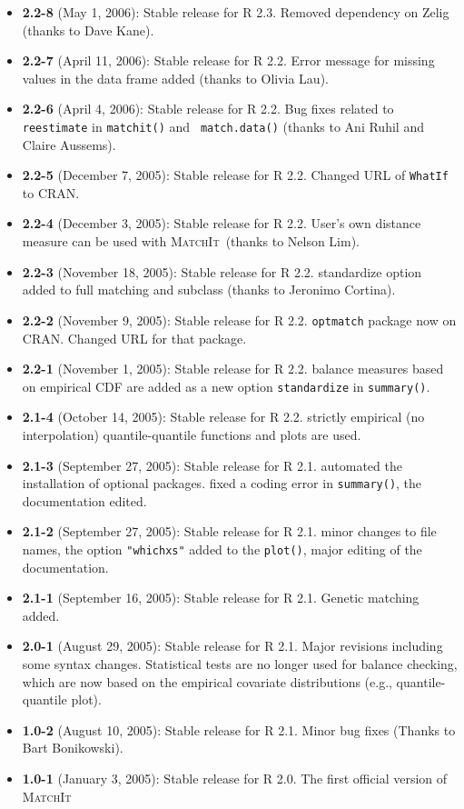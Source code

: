 \documentclass[oneside,letterpaper,12pt]{book}
\newcommand{\MatchIt}{\textsc{MatchIt}}
\begin{document}
\begin{itemize}
\item \textbf{2.2-8} (May 1, 2006): Stable release for R 2.3.
  Removed dependency on Zelig (thanks to Dave Kane).
\item \textbf{2.2-7} (April 11, 2006): Stable release for R 2.2.
  Error message for missing values in the data frame added
  (thanks to Olivia Lau).
\item \textbf{2.2-6} (April 4, 2006): Stable release for R 2.2.
  Bug fixes related to {\tt reestimate} in {\tt matchit()} and {\tt
  match.data()} (thanks to Ani Ruhil and Claire Aussems). 
\item \textbf{2.2-5} (December 7, 2005): Stable release for R 2.2.
  Changed URL of {\tt WhatIf} to CRAN.
\item \textbf{2.2-4} (December 3, 2005): Stable release for R 2.2.
  User's own distance measure can be used with \MatchIt\, (thanks to
  Nelson Lim).
\item \textbf{2.2-3} (November 18, 2005): Stable release for R 2.2.
  standardize option added to full matching and subclass (thanks to
  Jeronimo Cortina).
\item \textbf{2.2-2} (November 9, 2005): Stable release for R 2.2.
  {\tt optmatch} package now on CRAN. Changed URL for that package. 
\item \textbf{2.2-1} (November 1, 2005): Stable release for R 2.2.
  balance measures based on empirical CDF are added as a new option
  {\tt standardize} in {\tt summary()}.
\item \textbf{2.1-4} (October 14, 2005): Stable release for R 2.2.
  strictly empirical (no interpolation) quantile-quantile functions
  and plots are used.
\item \textbf{2.1-3} (September 27, 2005): Stable release for R 2.1.
  automated the installation of optional packages. fixed a coding
  error in {\tt summary()}, the documentation edited.
\item \textbf{2.1-2} (September 27, 2005): Stable release for R 2.1.
  minor changes to file names, the option {\tt "whichxs"} added to the
  {\tt plot()}, major editing of the documentation.
\item \textbf{2.1-1} (September 16, 2005): Stable release for R
        2.1. Genetic matching added.    
\item \textbf{2.0-1} (August 29, 2005): Stable release for R 2.1.
  Major revisions including some syntax changes. Statistical tests are
  no longer used for balance checking, which are now based on the
  empirical covariate distributions (e.g., quantile-quantile plot).
\item \textbf{1.0-2} (August 10, 2005): Stable release for R
  2.1. Minor bug fixes (Thanks to Bart Bonikowski).
\item \textbf{1.0-1} (January 3, 2005): Stable release for R 2.0. The
  first official version of \MatchIt
\end{itemize}



\clearpage



\end{document}
